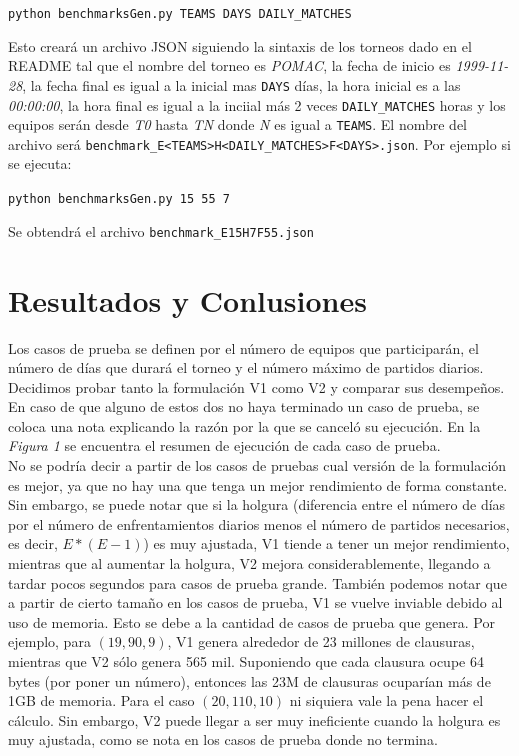 \documentclass[a4paper,10pt]{article}
\begin{document}
    \begin{center}
      \verb|python benchmarksGen.py TEAMS DAYS DAILY_MATCHES|
    \end{center}

    Esto crear\'a un archivo JSON siguiendo la sintaxis de los torneos dado en el 
    README tal que el nombre del torneo es \textit{POMAC}, la fecha de inicio es 
    \textit{1999-11-28}, la fecha final es igual a la inicial mas \verb|DAYS| d\'ias,
    la hora inicial es a las \textit{00:00:00}, la hora final es igual a la inciial 
    m\'as 2 veces \verb|DAILY_MATCHES| horas y los equipos ser\'an desde \textit{T0}
    hasta \textit{TN} donde \textit{N} es igual a \verb|TEAMS|. El nombre del archivo 
    ser\'a \verb|benchmark_E<TEAMS>H<DAILY_MATCHES>F<DAYS>.json|. Por ejemplo si se 
    ejecuta:

    \begin{center}
      \verb|python benchmarksGen.py 15 55 7|
    \end{center}

    Se obtendr\'a el archivo \verb|benchmark_E15H7F55.json|


\section{Resultados y Conlusiones}
  Los casos de prueba se definen por el n\'umero de equipos que participar\'an, 
  el n\'umero de d\'ias que durar\'a el torneo y el n\'umero m\'aximo de partidos
  diarios. Decidimos probar tanto la formulaci\'on V1 como V2 y comparar sus 
  desempe\~nos. En caso de que alguno de estos dos no haya terminado un caso de 
  prueba, se coloca una nota explicando la raz\'on por la que se cancel\'o su 
  ejecuci\'on. En la \textit{Figura 1} se encuentra el resumen de ejecuci\'on de 
  cada caso de prueba.\\ 

  No se podr\'ia decir a partir de los casos de pruebas cual versi\'on de la 
  formulaci\'on es mejor, ya que no hay una que tenga un mejor rendimiento de 
  forma constante. Sin embargo, se puede notar que si la holgura (diferencia entre 
  el n\'umero de d\'ias por el n\'umero de enfrentamientos diarios menos el n\'umero 
  de partidos necesarios, es decir, $E * (E-1)$) es muy ajustada, V1 tiende a tener 
  un mejor rendimiento, mientras que al aumentar la holgura, V2 mejora 
  considerablemente, llegando a tardar pocos segundos para casos de prueba grande.
  Tambi\'en podemos notar que a partir de cierto tama\~no en los casos de prueba,
  V1 se vuelve inviable debido al uso de memoria. Esto se debe a la cantidad de 
  casos de prueba que genera. Por ejemplo, para $(19, 90, 9)$, V1 genera alrededor
  de 23 millones de clausuras, mientras que V2 s\'olo genera 565 mil. Suponiendo que 
  cada clausura ocupe 64 bytes (por poner un n\'umero), entonces las 23M de 
  clausuras ocupar\'ian m\'as de 1GB de memoria. Para el caso $(20, 110, 10)$ ni
  siquiera vale la pena hacer el c\'alculo. Sin embargo, V2 puede llegar a ser muy ineficiente cuando la holgura es muy 
  ajustada, como se nota en los casos de prueba donde no termina. \\
\end{document}
